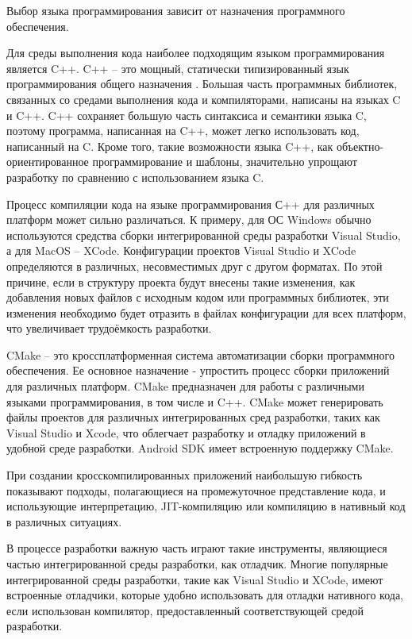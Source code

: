 Выбор языка программирования зависит от назначения программного обеспечения.

Для среды выполнения кода наиболее подходящим языком программирования является C++.
C++ -- это мощный, статически типизированный язык программирования общего назначения \cite{CPlusPlus}. 
Большая часть программных библиотек, связанных со средами выполнения кода и компиляторами, написаны на языках C и C++.
C++ сохраняет большую часть синтаксиса и семантики языка C, поэтому программа, написанная на C++, может легко использовать код, написанный на C.
Кроме того, такие возможности языка C++, как объектно-ориентированное программирование и шаблоны, значительно упрощают разработку по сравнению с использованием языка C.

Процесс компиляции кода на языке программирования С++ для различных платформ может сильно различаться.
К примеру, для ОС Windows обычно используются средства сборки интегрированной среды разработки Visual Studio, а для MacOS -- XCode.
Конфигурации проектов Visual Studio и XCode определяются в различных, несовместимых друг с другом форматах.
По этой причине, если в структуру проекта будут внесены такие изменения, как добавления новых файлов с исходным кодом или программных библиотек, эти изменения необходимо будет отразить в файлах конфигурации для всех платформ, что увеличивает трудоёмкость разработки.

CMake -- это кроссплатформенная система автоматизации сборки программного обеспечения. Ее основное назначение - упростить процесс сборки приложений для различных платформ. 
CMake предназначен для работы с различными языками программирования, в том числе и C++.
CMake может генерировать файлы проектов для различных интегрированных сред разработки, таких как Visual Studio и Xcode, что облегчает разработку и отладку приложений в удобной среде разработки.
Android SDK имеет встроенную поддержку CMake.

При создании кросскомпилированных приложений наибольшую гибкость показывают подходы, полагающиеся на промежуточное представление кода, и использующие интерпретацию, JIT-компиляцию или компиляцию в нативный код в различных ситуациях.

В процессе разработки важную часть играют такие инструменты, являющиеся частью интегрированной среды разработки, как отладчик.
Многие популярные интегрированной среды разработки, такие как Visual Studio и XCode, имеют встроенные отладчики, которые удобно использовать для отладки нативного кода, если использован компилятор, предоставленный соответствующей средой разработки.

